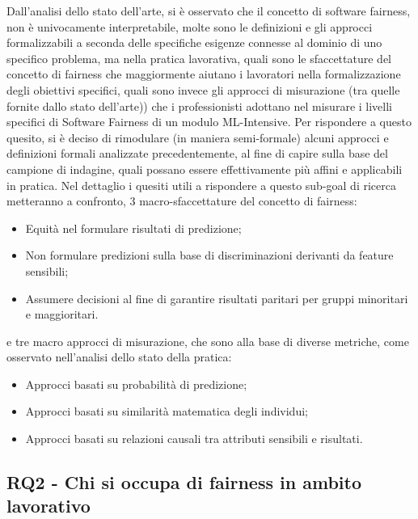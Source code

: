 	Dall'analisi dello stato dell'arte, si è osservato che il concetto di software fairness, non è univocamente interpretabile, molte sono le definizioni e gli approcci formalizzabili a seconda delle specifiche esigenze connesse al dominio di uno specifico problema, ma nella pratica lavorativa, quali sono le sfaccettature del concetto di fairness che maggiormente aiutano i lavoratori nella formalizzazione degli obiettivi specifici, quali sono invece gli approcci di misurazione (tra quelle fornite dallo stato dell'arte)) che i professionisti adottano nel misurare i livelli specifici di Software Fairness di un modulo ML-Intensive. Per rispondere a questo quesito, si è deciso di rimodulare (in maniera semi-formale) alcuni approcci e definizioni formali analizzate precedentemente, al fine di capire sulla base del campione di indagine, quali possano essere effettivamente più affini e applicabili in pratica. Nel dettaglio i quesiti utili a rispondere a questo sub-goal di ricerca metteranno a confronto, 3 macro-sfaccettature del concetto di fairness:
	
	\begin{itemize}
		\item Equità nel formulare risultati di predizione;
		\item Non formulare predizioni sulla base di discriminazioni derivanti da feature sensibili;
		\item Assumere decisioni al fine di garantire risultati paritari per gruppi minoritari e maggioritari.
	\end{itemize}

	e tre macro approcci di misurazione, che sono alla base di diverse metriche, come osservato nell'analisi dello stato della pratica:
	
	\begin{itemize}
		\item Approcci basati su probabilità di predizione;
		\item Approcci basati su similarità matematica degli individui;
		\item Approcci basati su relazioni causali tra attributi sensibili e risultati.
	\end{itemize}
	\newpage
	
	\subsection{RQ2 - Chi si occupa di fairness in ambito lavorativo}
	\begin{center}
		\hspace*{-5mm}%
	\end{center}
	

